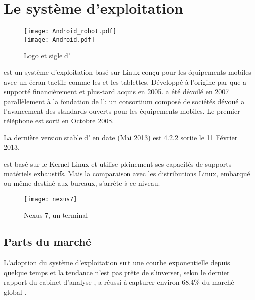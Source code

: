 \section{Le système d'exploitation \android{}}

\begin{figure}[H]
\begin{center}
\texttt{[image: Android\_robot.pdf]}\\
\texttt{[image: Android.pdf]}
\end{center}
\caption{Logo et sigle d'\android{}}
\end{figure}

\android{} est un système d'exploitation basé sur Linux conçu pour les
équipements mobiles avec un écran tactile comme les  et
les tablettes. Développé à l'origine par  que
 a supporté financièrement et plus-tard acquis en 2005.
\android{} a été dévoilé en 2007 parallèlement à la fondation de
l': un consortium composé de sociétés dévoué a
l'avancement des standards ouverts pour les équipements mobiles. Le
premier téléphone  \android{} est sorti en Octobre 2008.

La dernière version stable d'\android{} en date (Mai 2013) est 4.2.2
 sortie le 11 Février 2013.

\android{} est basé sur le Kernel Linux et utilise pleinement ses capacités de supports matériels exhaustifs. Mais la comparaison avec les distributions Linux, embarqué ou même destiné aux bureaux, s'arrête à ce niveau.~\cite{lft:growth_android}

\begin{figure}
\centering
\texttt{[image: nexus7]}
\caption{ Nexus 7, un terminal \android}
\end{figure}

\subsection{Parts du marché}

L’adoption du système d'exploitation \android{} suit une courbe
exponentielle depuis quelque temps et la tendance n'est pas prête de
s’inverser, selon le dernier rapport du cabinet d'analyse , \android{} a réussi à capturer environ 68.4\% du marché
global \cite{venturebeat.com}.

